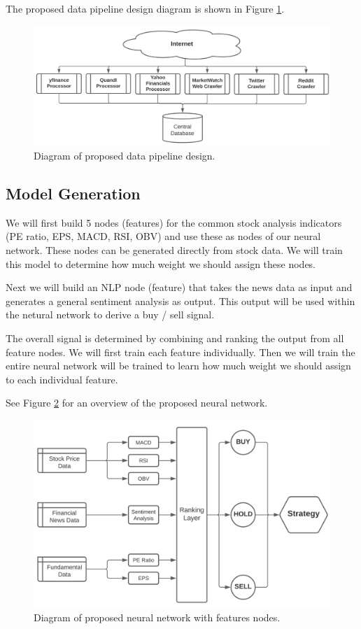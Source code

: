 \documentclass[10pt]{article}
\begin{document}
The proposed data pipeline design diagram is shown in Figure \ref{fig:datapipe}.

\begin{figure}[h]
    \centering
    \includegraphics[scale=0.35]{datapipe}
    \caption{Diagram of proposed data pipeline design.}
    \label{fig:datapipe}
\end{figure}

\subsection{Model Generation}

We will first build 5 nodes (features) for the common stock analysis indicators (PE ratio, EPS, MACD, RSI, OBV) and use these as nodes of our neural network. These nodes can be generated directly from stock data. We will train this model to determine how much weight we should assign these nodes.

Next we will build an NLP node (feature) that takes the news data as input and generates a general sentiment analysis as output. This output will be used within the netural network to derive a buy / sell signal.

The overall signal is determined by combining and ranking the output from all feature nodes. We will first train each feature individually. Then we will train the entire neural network will be trained to learn how much weight we should assign to each individual feature.

See Figure \ref{fig:network} for an overview of the proposed neural network.

\begin{figure}[h]
    \centering
    \includegraphics[scale=0.37]{network}
    \caption{Diagram of proposed neural network with features nodes.}
    \label{fig:network}
\end{figure}
\end{document}

